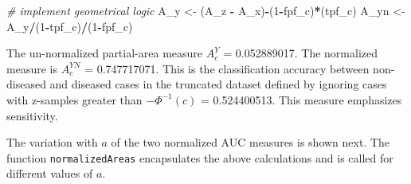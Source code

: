 \documentclass[
]{book}
\newenvironment{Shaded}{\begin{snugshade}}{\end{snugshade}}
\newcommand{\CommentTok}[1]{\textcolor[rgb]{0.56,0.35,0.01}{\textit{#1}}}
\newcommand{\ControlFlowTok}[1]{\textcolor[rgb]{0.13,0.29,0.53}{\textbf{#1}}}
\newcommand{\DataTypeTok}[1]{\textcolor[rgb]{0.13,0.29,0.53}{#1}}
\newcommand{\DecValTok}[1]{\textcolor[rgb]{0.00,0.00,0.81}{#1}}
\newcommand{\FloatTok}[1]{\textcolor[rgb]{0.00,0.00,0.81}{#1}}
\newcommand{\KeywordTok}[1]{\textcolor[rgb]{0.13,0.29,0.53}{\textbf{#1}}}
\newcommand{\NormalTok}[1]{#1}
\newcommand{\OperatorTok}[1]{\textcolor[rgb]{0.81,0.36,0.00}{\textbf{#1}}}
\newcommand{\StringTok}[1]{\textcolor[rgb]{0.31,0.60,0.02}{#1}}
\begin{document}
\begin{Shaded}
\begin{Highlighting}[]
\CommentTok{# implement geometrical logic}
\NormalTok{A_y <-}\StringTok{ }\NormalTok{(A_z }\OperatorTok{-}\StringTok{ }\NormalTok{A_x)}\OperatorTok{-}\NormalTok{(}\DecValTok{1}\OperatorTok{-}\NormalTok{fpf_c)}\OperatorTok{*}\NormalTok{(tpf_c)}
\NormalTok{A_yn <-}\StringTok{ }\NormalTok{A_y}\OperatorTok{/}\NormalTok{(}\DecValTok{1}\OperatorTok{-}\NormalTok{tpf_c)}\OperatorTok{/}\NormalTok{(}\DecValTok{1}\OperatorTok{-}\NormalTok{fpf_c) }
\end{Highlighting}
\end{Shaded}

The un-normalized partial-area measure \(A_c^{Y}\) = 0.052889017. The normalized measure is \(A_c^{YN}\) = 0.747717071. This is the classification accuracy between non-diseased and diseased cases in the truncated dataset defined by ignoring cases with z-samples greater than \(-\Phi^{-1}(c)\) = 0.524400513. This measure emphasizes sensitivity.

The variation with \(a\) of the two normalized AUC measures is shown next. The function \texttt{normalizedAreas} encapsulates the above calculations and is called for different values of \(a\).

\begin{Shaded}
\end{Shaded}
\end{document}
